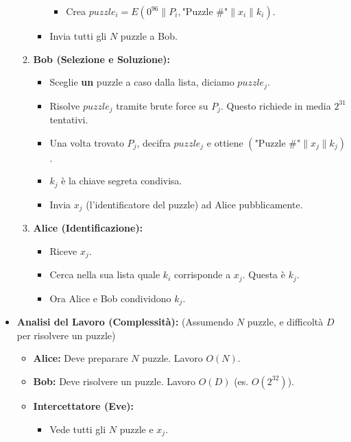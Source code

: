 \begin{itemize}
\begin{enumerate}
\begin{itemize}
\begin{itemize}
                            \item Crea $puzzle_i = E(0^{96} \parallel P_i, \text{"Puzzle \#"} \parallel x_i \parallel k_i)$.
                        \end{itemize}
                    \item Invia tutti gli $N$ puzzle a Bob.
                \end{itemize}
            \item \textbf{Bob (Selezione e Soluzione):}
                \begin{itemize}
                    \item Sceglie \textbf{un} puzzle a caso dalla lista, diciamo $puzzle_j$.
                    \item Risolve $puzzle_j$ tramite brute force su $P_j$. Questo richiede in media $2^{31}$ tentativi.
                    \item Una volta trovato $P_j$, decifra $puzzle_j$ e ottiene $(\text{"Puzzle \#"} \parallel x_j \parallel k_j)$.
                    \item $k_j$ è la chiave segreta condivisa.
                    \item Invia $x_j$ (l'identificatore del puzzle) ad Alice pubblicamente.
                \end{itemize}
            \item \textbf{Alice (Identificazione):}
                \begin{itemize}
                    \item Riceve $x_j$.
                    \item Cerca nella sua lista quale $k_i$ corrisponde a $x_j$. Questa è $k_j$.
                    \item Ora Alice e Bob condividono $k_j$.
                \end{itemize}
        \end{enumerate}
    \item \textbf{Analisi del Lavoro (Complessità):} (Assumendo $N$ puzzle, e difficoltà $D$ per risolvere un puzzle)
        \begin{itemize}
            \item \textbf{Alice:} Deve preparare $N$ puzzle. Lavoro $O(N)$.
            \item \textbf{Bob:} Deve risolvere un puzzle. Lavoro $O(D)$ (es. $O(2^{32})$).
            \item \textbf{Intercettatore (Eve):}
                \begin{itemize}
                    \item Vede tutti gli $N$ puzzle e $x_j$.

\end{itemize}
\end{itemize}
\end{itemize}
